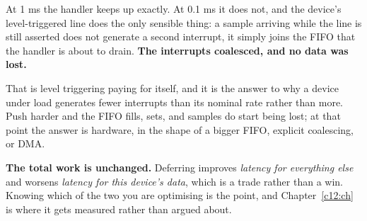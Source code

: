 \noindent At 1 ms the handler keeps up exactly. At 0.1 ms it does not, and the device's
level-triggered line does the only sensible thing: a sample arriving while the line is still
asserted does not generate a second interrupt, it simply joins the FIFO that the handler is about to
drain. \textbf{The interrupts coalesced, and no data was lost.}

That is level triggering paying for itself, and it is the answer to why a device under load
generates fewer interrupts than its nominal rate rather than more. Push harder and the FIFO fills,
 sets, and samples do start being lost; at that point the answer is hardware, in the
shape of a bigger FIFO, explicit coalescing, or DMA.

\textbf{The total work is unchanged.} Deferring improves \emph{latency for everything else} and
worsens \emph{latency for this device's data}, which is a trade rather than a win. Knowing which of
the two you are optimising is the point, and Chapter~\ref{c12:ch} is where it gets measured rather
than argued about.
